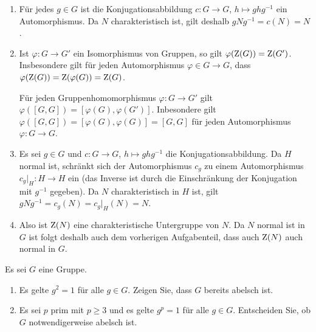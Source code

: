 \begin{solution}
  \begin{enumerate}
    \item
      Für jedes $g \in G$ ist die Konjugationsabbildung $c \colon G \to G$, $h \mapsto ghg^{-1}$ ein Automorphismus.
      Da $N$ charakteristisch ist, gilt deshalb $gNg^{-1} = c(N) = N$.
    \item
      Ist $\varphi \colon G \to G'$ ein Isomorphismus von Gruppen, so gilt $\varphi(\operatorname{Z}(G)) = \operatorname{Z}(G')$.
      Insbesondere gilt für jeden Automorphismus $\varphi \in G \to G$, dass $\varphi(\operatorname{Z}(G)) = \operatorname{Z}(\varphi(G)) = \operatorname{Z}(G)$.
      
      Für jeden Gruppenhomomorphismus $\varphi \colon G \to G'$ gilt $\varphi([G,G]) = [\varphi(G), \varphi(G')]$.
      Inbesondere gilt $\varphi([G,G]) = [\varphi(G), \varphi(G)] = [G,G]$ für jeden Automorphismus $\varphi \colon G \to G$.
    \item
      Es sei $g \in G$ und $c \colon G \to G$, $h \mapsto ghg^{-1}$ die Konjugationsabbildung.
      Da $H$ normal ist, schränkt sich der Automorphismus $c_g$ zu einem Automorphismus $c_g|_H \colon H \to H$ ein (das Inverse ist durch die Einschränkung der Konjugation mit $g^{-1}$ gegeben).
      Da $N$ charakteristisch in $H$ ist, gilt $g N g^{-1} = c_g(N) = c_g|_H(N) = N$.
    \item
      
      Also ist $\operatorname{Z}(N)$ eine charakteristische Untergruppe von $N$.
      Da $N$ normal ist in $G$ ist folgt deshalb auch dem vorherigen Aufgabenteil, dass auch $\operatorname{Z}(N)$ auch normal in $G$.
  \end{enumerate}
\end{solution}


\begin{question}[subtitle = Gruppen in denen alles Primordnung hat]
  Es sei $G$ eine Gruppe.
  \begin{enumerate}
    \item
      Es gelte $g^2 = 1$ für alle $g \in G$.
      Zeigen Sie, dass $G$ bereits abelsch ist.
    \item
      Es sei $p$ prim mit $p \geq 3$ und es gelte $g^p = 1$ für alle $g \in G$.
      Entscheiden Sie, ob $G$ notwendigerweise abelsch ist.
  \end{enumerate}
\end{question}


